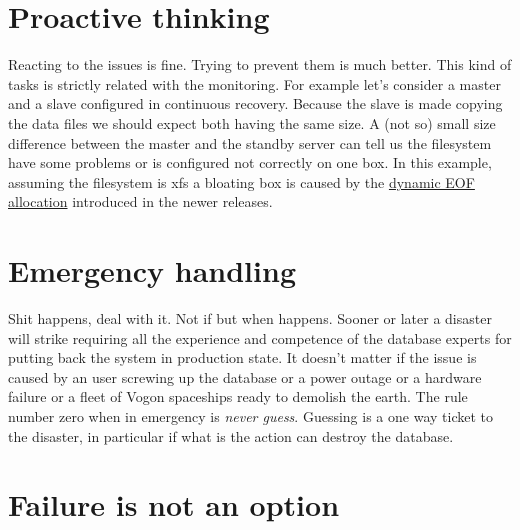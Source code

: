 \section{Proactive thinking}
Reacting to the issues is fine. Trying to prevent them is much better. This kind of tasks is strictly 
related with the monitoring. For example let's consider a master and a slave configured in continuous 
recovery. Because the slave is made copying the data files we should expect both having the same size. 
A (not so) small size difference between the master and the standby server can tell us the filesystem have 
some problems or is configured not correctly on one box. In this example, assuming the filesystem is xfs a 
bloating box is caused by the 
\href{
http://serverfault.com/questions/406069/why-are-my-xfs-filesystems-suddenly-consuming-more-space-and-full-of
-sparse-file}{dynamic EOF allocation} introduced in the newer releases.

\section{Emergency handling}
Shit happens, deal with it. Not if but when happens. Sooner or later a disaster will strike requiring all 
the experience and competence of the database experts for putting back the system in production state. It 
doesn't matter if the issue is caused by an user screwing up the database or a power outage or a hardware 
failure or a fleet of Vogon spaceships ready to demolish the earth. The rule number zero when in emergency 
is \textit{never guess}. Guessing is a one way ticket to the disaster, in particular if what is the action 
can destroy the database. 


\section{Failure is not an option}